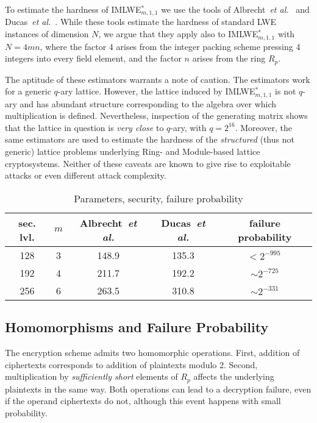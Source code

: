 To estimate the hardness of IMLWE$^*_{m, 1, 1}$ we use the tools of Albrecht~\emph{et al.}~\cite{albrecht-estimator} and Ducas~\emph{et al.}~\cite{ducas-estimator}. While these tools estimate the hardness of standard LWE instances of dimension $N$, we argue that they apply also to IMLWE$^*_{m,1,1}$ with $N = 4 m n$, where the factor 4 arises from the integer packing scheme pressing 4 integers into every field element, and the factor $n$ arises from the ring $R_p$.

The aptitude of these estimators warrants a note of caution. The estimators work for a generic $q$-ary lattice. However, the lattice induced by IMLWE$^*_{m,1,1}$ is not $q$-ary and has abundant structure corresponding to the algebra over which multiplication is defined. Nevertheless, inspection of the generating matrix shows that the lattice in question is \emph{very close} to $q$-ary, with $q = 2^{16}$. Moreover, the same estimators are used to estimate the hardness of the \emph{structured} (thus not generic) lattice problems underlying Ring- and Module-based lattice cryptosystems. Neither of these caveats are known to give rise to exploitable attacks or even different attack complexity.

\begin{table}
\centering
\caption{Parameters, security, failure probability}
\label{table:parameters}
\begin{tabular}{c||c|c|c|c}
sec. lvl. & $m$ & Albrecht~\emph{et al.} & Ducas~\emph{et al.} & failure probability \\ \hline
128 & 3 & 148.9 & 135.3 & $< 2^{-995\phantom{\vert}}$ \\
192 & 4 & 211.7 & 192.2 & $\sim 2^{-725}$ \\
256 & 6 & 263.5 & 310.8 & $\sim 2^{-331}$
\end{tabular}
\end{table}

\subsection{Homomorphisms and Failure Probability}

The encryption scheme admits two homomorphic operations. First, addition of ciphertexts corresponds to addition of plaintexts modulo 2. Second, multiplication by \emph{sufficiently short} elements of $R_p$ affects the underlying plaintexts in the same way. Both operations can lead to a decryption failure, even if the operand ciphertexts do not, although this event happens with small probability.

